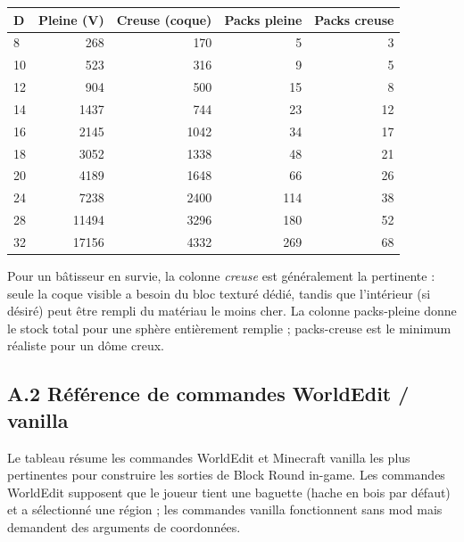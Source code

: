 \documentclass[12pt,a4paper]{scrartcl}
\begin{document}
\vspace{0.4em}
\begin{center}
\begin{tabular}{@{}lrrrr@{}}
\toprule
\textbf{D} & \textbf{Pleine (V)} & \textbf{Creuse (coque)} & \textbf{Packs pleine} & \textbf{Packs creuse} \\
\midrule
8   &   268 &   170 &  5  &  3  \\
10  &   523 &   316 &  9  &  5  \\
12  &   904 &   500 & 15  &  8  \\
14  &  1437 &   744 & 23  & 12  \\
16  &  2145 &  1042 & 34  & 17  \\
18  &  3052 &  1338 & 48  & 21  \\
20  &  4189 &  1648 & 66  & 26  \\
24  &  7238 &  2400 & 114 & 38  \\
28  & 11494 &  3296 & 180 & 52  \\
32  & 17156 &  4332 & 269 & 68  \\
\bottomrule
\end{tabular}
\end{center}

Pour un bâtisseur en survie, la colonne \emph{creuse} est généralement la pertinente : seule la coque visible a besoin du bloc texturé dédié, tandis que l'intérieur (si désiré) peut être rempli du matériau le moins cher. La colonne packs-pleine donne le stock total pour une sphère entièrement remplie ; packs-creuse est le minimum réaliste pour un dôme creux.

\subsection*{A.2 Référence de commandes WorldEdit / vanilla}
Le tableau résume les commandes WorldEdit et Minecraft vanilla les plus pertinentes pour construire les sorties de Block Round in-game. Les commandes WorldEdit supposent que le joueur tient une baguette (hache en bois par défaut) et a sélectionné une région ; les commandes vanilla fonctionnent sans mod mais demandent des arguments de coordonnées.
\end{document}
